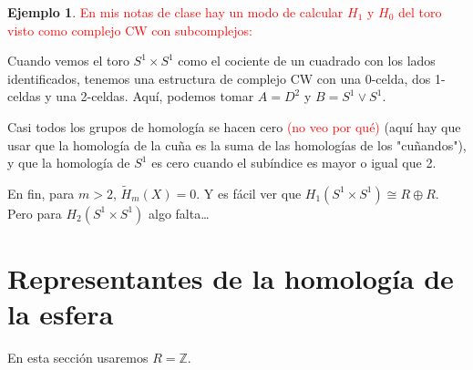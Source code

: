 \documentclass[spanish]{book}
\theoremstyle{definition}
\newtheorem*{ejem}{Ejemplo}
\begin{document}
\begin{ejem}\label{ejem:toroCWMV}
	\textcolor{red}{En mis notas de clase hay un modo de calcular $H_1$ y $H_0$ del toro visto como complejo CW con subcomplejos:}
	
	Cuando vemos el toro $S^1\times S^1$ como el cociente de un cuadrado con los lados identificados, tenemos una estructura de complejo CW con una 0-celda, dos 1-celdas y una 2-celdas. Aquí, podemos tomar $A=D^2$ y $B=S^1\vee S^1$.
	
	Casi todos los grupos de homología se hacen cero \textcolor{red}{(no veo por qué)} (aquí hay que usar que la homología de la cuña es la suma de las homologías de los "cuñandos"), y que la homología de $S^1$ es cero cuando el subíndice es mayor o igual que 2.
	
	En fin, para $m>2$, $\tilde H_m(X)=0$. Y es fácil ver que $H_1(S^1\times S^1)\cong R\oplus R$. Pero para $H_2(S^1\times S^1)$ algo falta…
	
\end{ejem}

\section{Representantes de la homología de la esfera}
	En esta sección usaremos $R=\mathbb Z$. 
	
\end{document}
